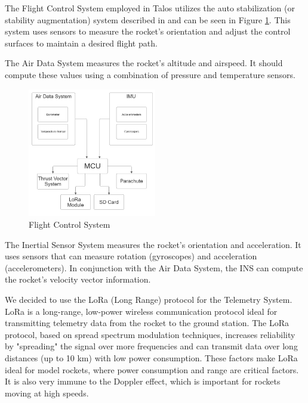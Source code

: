 \documentclass{article}
\begin{document}
The Flight Control System employed in Talos utilizes the auto stabilization (or stability augmentation) system described in \cite{Collinson_2012} and can be seen in Figure \ref{fig:flowchart}. This system uses sensors to measure the rocket's orientation and adjust the control surfaces to maintain a desired flight path.


The Air Data System measures the rocket's altitude and airspeed. It should compute these values using a combination of pressure and temperature sensors.

\newpage

\begin{figure}
      \caption{Flight Control System}
      \label{fig:flowchart}
      \centering
      \includegraphics[width=0.5\textwidth]{flowchart.png}
\end{figure}


The Inertial Sensor System measures the rocket's orientation and acceleration. It uses sensors that can measure rotation (gyroscopes) and acceleration (accelerometers). In conjunction with the Air Data System, the INS can compute the rocket's velocity vector information.

We decided to use the LoRa (Long Range) protocol for the Telemetry System. LoRa is a long-range, low-power wireless communication protocol ideal for transmitting telemetry data from the rocket to the ground station. The LoRa protocol, based on spread spectrum modulation techniques, increases reliability by "spreading" the signal over more frequencies and can transmit data over long distances (up to 10 km) with low power consumption. These factors make LoRa ideal for model rockets, where power consumption and range are critical factors. It is also very immune to the Doppler effect\cite{8723123}, which is important for rockets moving at high speeds.
\newline
\end{document}
